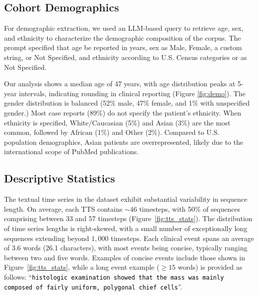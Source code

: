 \subsection{Cohort Demographics}
\label{sec:demographics}

For demographic extraction, we used an LLM-based query to retrieve age, sex, and ethnicity to characterize the demographic composition of the corpus. The prompt specified that age be reported in years, sex as Male, Female, a custom string, or Not Specified, and ethnicity according to U.S. Census categories or as Not Specified.



Our analysis shows a median age of 47 years, with age distribution peaks at 5-year intervals, indicating rounding in clinical reporting (Figure \ref{fig:demo}). The gender distribution is balanced (52\% male, 47\% female, and 1\% with unspecified gender.) Most case reports (89\%) do not specify the patient's ethnicity. When ethnicity is specified, White/Caucasian (5\%) and Asian (3\%) are the most common, followed by African (1\%) and Other (2\%). Compared to U.S. population demographics, Asian patients are overrepresented, likely due to the international scope of PubMed publications.




\subsection{Descriptive Statistics}

The textual time series in the dataset exhibit substantial variability in sequence length. 
On average, each TTS contains $\sim46$ timesteps, with 50\% of sequences comprising between 33 and 57 timesteps (Figure~\ref{fig:tts_stats}). 
The distribution of time series lengths is right-skewed, with a small number of exceptionally long sequences extending beyond $1,000$ timesteps. 
Each clinical event spans an average of 3.6 words (26.1 characters), with most events being concise, typically ranging between two and five words. 
Examples of concise events include those shown in Figure~\ref{fig:tts_stats}, while a long event example ($\geq15$ words) is provided as follows: ``\textcolor{black}{\texttt{histologic examination showed that the mass was mainly composed of fairly uniform, polygonal chief cells}}''.

